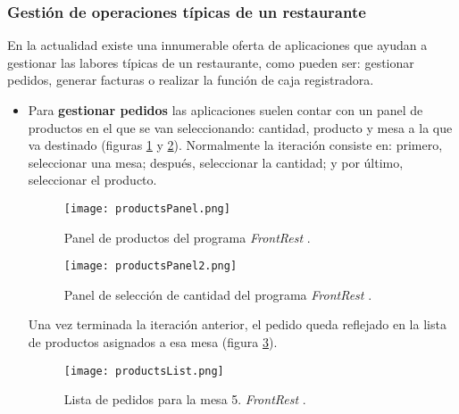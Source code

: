     \subsubsection{Gestión de operaciones típicas de un restaurante}
    En la actualidad existe una innumerable oferta de aplicaciones que ayudan
    a gestionar las labores típicas de un restaurante, como pueden ser:
    gestionar pedidos, generar facturas o realizar la función de caja 
    registradora.

    \begin{itemize}
    \item Para \textbf{gestionar pedidos} las aplicaciones suelen contar con 
    un panel de productos en el que se van seleccionando: cantidad, producto y 
    mesa a la que va destinado (figuras \ref{fig:productsPanel} y
    \ref{fig:productsPanel2}). Normalmente la iteración consiste en: primero,
    seleccionar una mesa; después, seleccionar la cantidad; y por último,
    seleccionar el producto.

    \begin{figure}[!h]
      \begin{center}
        \texttt{[image: productsPanel.png]}
        \caption{Panel de productos del programa \emph{FrontRest}
        \cite{bib:frontRest}.}
        \label{fig:productsPanel}
      \end{center}
    \end{figure}

    \begin{figure}[!h]
      \begin{center}
        \texttt{[image: productsPanel2.png]}
        \caption{Panel de selección de cantidad del programa \emph{FrontRest}
        \cite{bib:frontRest}.}
        \label{fig:productsPanel2}
      \end{center}
    \end{figure}

    Una vez terminada la iteración anterior, el pedido queda reflejado en la
    lista de productos asignados a esa mesa (figura \ref{fig:productsList}).

    \begin{figure}[!h]
      \begin{center}
        \texttt{[image: productsList.png]}
        \caption{Lista de pedidos para la mesa 5. \emph{FrontRest}
        \cite{bib:frontRest}.}
        \label{fig:productsList}
      \end{center}
    \end{figure}


\end{itemize}

